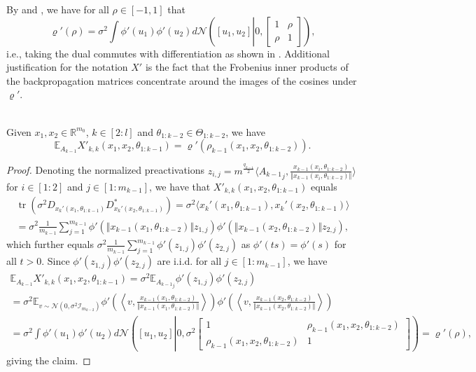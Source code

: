 \documentclass[twoside,11pt]{article}
\newcommand{\R}{\mathbb{R}}
\newcommand{\E}{\mathbb{E}}
\newcommand{\Id}{\mathcal{I}}
\DeclareMathOperator{\tr}{tr}
\begin{document}
By \citet[Proposition~7]{mlpsateoc1} and \citet[Proposition~9]{mlpsateoc1}, we have for all $\rho \in [-1,1]$ that
\[
\varrho'(\rho) 
= \sigma^2 \int \phi'(u_1) \phi'(u_2) d\mathcal{N}\left( [u_1,u_2] \left\vert 0,\left[ \begin{smallmatrix} 1 & \rho \\ \rho & 1 \end{smallmatrix} \right] \right. \right),
\]
i.e., taking the dual commutes with differentiation as shown in \citet{Danielyetal2016}. Additional justification for the notation $X'$ is the fact that the Frobenius inner products of the backpropagation matrices concentrate around the images of the cosines under $\varrho'$.

\begin{proposition}~\\
Given $x_1,x_2 \in \R^{m_0}$, $k \in [2:l]$ and $\theta_{1:k-2} \in \Theta_{1:k-2}$, we have
\[
\E_{A_{k-1}} X'_{k,k}(x_1,x_2,\theta_{1:k-1})
= \varrho'(\rho_{k-1}(x_1,x_2,\theta_{1:k-2})).
\]
\end{proposition}
\begin{proof}
Denoting the normalized preactivations $z_{i,j} = m^{\frac{q_{k-1}}{2}} \langle {A_{k-1}}_j, \frac{x_{k-1}(x_i, \theta_{1 : k-2})}{\Vert x_{k-1}(x_i, \theta_{1 : k-2}) \Vert} \rangle$ for $i \in [1:2]$ and $j \in [1:m_{k-1}]$, we have that $X'_{k,k}(x_1,x_2,\theta_{1:k-1})$ equals
\begin{multline*}
\tr\left( \sigma^2 D_{x_k'(x_1,\theta_{1 : k-1})} D_{x_k'(x_2,\theta_{1 : k-1})}^* \right)
= \sigma^2 \langle x_k'(x_1,\theta_{1 : k-1}), x_k'(x_2,\theta_{1 : k-1}) \rangle \\
= \sigma^2 \frac{1}{m_{k-1}} \sum_{j=1}^{m_{k-1}} \phi'(\Vert x_{k-1}(x_1, \theta_{1 : k-2}) \Vert z_{1,j}) \phi'(\Vert x_{k-1}(x_2, \theta_{1 : k-2}) \Vert z_{2,j}),
\end{multline*}
which further equals $\sigma^2 \frac{1}{m_{k-1}} \sum_{j=1}^{m_{k-1}} \phi'(z_{1,j}) \phi'(z_{2,j})$ as $\phi'(ts)=\phi'(s)$ for all $t > 0$. Since $\phi'(z_{1,j}) \phi'(z_{2,j})$ are i.i.d. for all $j \in [1:m_{k-1}]$, we have
\begin{multline*}
\E_{A_{k-1}} X'_{k,k}(x_1,x_2,\theta_{1:k-1})
= \sigma^2 \E_{{A_{k-1}}_j} \phi'( z_{1,j} ) \phi'( z_{2,j} ) \\
= \sigma^2 \E_{v \sim \mathcal{N}( 0, \sigma^2 \Id_{m_{k-2}} )} \phi'\left( \left\langle v, \frac{x_{k-1}(x_1, \theta_{1 : k-2})}{\Vert x_{k-1}(x_1, \theta_{1 : k-2}) \Vert} \right\rangle \right) \phi'\left( \left\langle v, \frac{x_{k-1}(x_2, \theta_{1 : k-2})}{\Vert x_{k-1}(x_2, \theta_{1 : k-2}) \Vert} \right\rangle \right) \\
= \sigma^2 \int \phi'(u_1) \phi'(u_2) d\mathcal{N}\left([u_1,u_2] \left| 0, \sigma^2 \left[ \begin{smallmatrix} 1 & \rho_{k-1}(x_1,x_2,\theta_{1:k-2}) \\ \rho_{k-1}(x_1,x_2,\theta_{1:k-2}) & 1 \end{smallmatrix} \right] \right. \right) 
= \varrho'(\rho),
\end{multline*}
giving the claim.
\end{proof}
\end{document}
